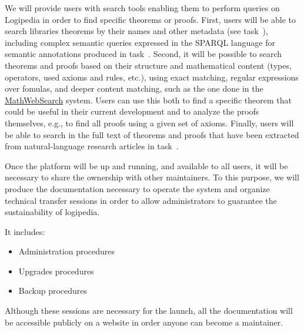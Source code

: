 \begin{workpackage}[id=access,wphases=0-48,type=MGT,
  short=Access,%
  title={Access to the infrastructure},
  lead=Inr,
  InrRM=28,
  OcaRM=6]
\begin{tasklist}
  \begin{task}[id=search,title=Providing search
    tools,lead=Inr,InrRM=28,FauRM=24,SacRM=6,BolRM=4]
    We will provide users with search tools enabling them to perform
    queries on Logipedia in order to find specific theorems or proofs.
    First, users will be able to search libraries theorems by their
    names and other metadata (see task~), including complex semantic
    queries expressed in the SPARQL language for semantic annotations
    produced in task~. Second, it will be possible to
    search theorems and proofs based on their structure and mathematical
    content (types, operators, used axioms and rules, etc.), using exact
    matching, regular expressions over fomulas, and deeper content
    matching, such as the one done in the
    \hyperlink{https://kwarc.info/systems/mws/}{MathWebSearch} system. Users can
    use this both to find a specific theorem that
    could be useful in their current development and to analyze the
    proofs themselves, e.g., to find all proofs using a given set of
    axioms.    
    Finally, users will be able to
    search in the full text of theorems and proofs that have been
    extracted from natural-language research articles in
    task~.
  \end{task}


\begin{task}[id=transfer,title=Transfer for the sustainability of the system,lead=Irt]
    Once the platform will be up and running, and available to all users, it will
    be necessary to share the ownership with other maintainers. To this purpose, we will
    produce the documentation necessary to operate the system and organize technical
    transfer sessions in order to allow administrators to guarantee the sustainability of
    logipedia.

    It includes:
    \begin{itemize}
        \item Administration procedures
        \item Upgrades procedures
        \item Backup procedures
    \end{itemize}

    Although these sessions are necessary for the launch, all the documentation will be
    accessible publicly on a website in order anyone can become a maintainer.


\end{task}
\end{tasklist}
\end{workpackage}
